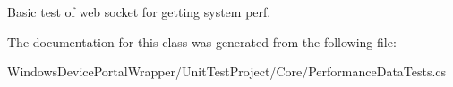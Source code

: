 Basic test of web socket for getting system perf. 



The documentation for this class was generated from the following file\+:\begin{DoxyCompactItemize}
\item 
Windows\+Device\+Portal\+Wrapper/\+Unit\+Test\+Project/\+Core/Performance\+Data\+Tests.\+cs\end{DoxyCompactItemize}
